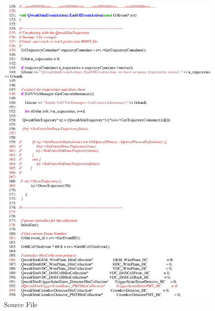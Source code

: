 \begin{figure}[h]
  \hspace{0cm}
  \includegraphics[scale=0.8]{./figures13/QweakSimEventAction.cc-p3.eps}
  \caption{Source File}
           \label{fig:XIII-SC-18}
\end{figure}

\clearpage

